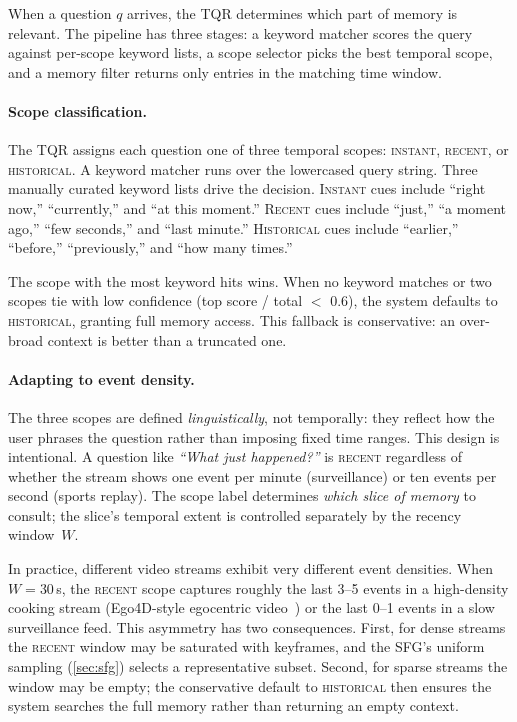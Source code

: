 When a question $q$ arrives, the TQR determines which part of memory is relevant.
The pipeline has three stages: a keyword matcher scores the query against per-scope keyword lists, a scope selector picks the best temporal scope, and a memory filter returns only entries in the matching time window.

\paragraph{Scope classification.}
The TQR assigns each question one of three temporal scopes: \textsc{instant}, \textsc{recent}, or \textsc{historical}.
A keyword matcher runs over the lowercased query string.
Three manually curated keyword lists drive the decision. \textsc{Instant} cues include ``right now,'' ``currently,'' and ``at this moment.'' \textsc{Recent} cues include ``just,'' ``a moment ago,'' ``few seconds,'' and ``last minute.'' \textsc{Historical} cues include ``earlier,'' ``before,'' ``previously,'' and ``how many times.''

The scope with the most keyword hits wins. When no keyword matches or two scopes tie with low confidence (top score / total $<$ 0.6), the system defaults to \textsc{historical}, granting full memory access. This fallback is conservative: an over-broad context is better than a truncated one.

\paragraph{Adapting to event density.}
The three scopes are defined \emph{linguistically}, not temporally: they reflect how the user phrases the question rather than imposing fixed time ranges.
This design is intentional.
A question like \emph{``What just happened?''} is \textsc{recent} regardless of whether the stream shows one event per minute (surveillance) or ten events per second (sports replay).
The scope label determines \emph{which slice of memory} to consult; the slice's temporal extent is controlled separately by the recency window~$W$.

In practice, different video streams exhibit very different event densities.
When $W = 30$\,s, the \textsc{recent} scope captures roughly the last 3--5 events in a high-density cooking stream (Ego4D-style egocentric video~\cite{grauman2022ego4d}) or the last 0--1 events in a slow surveillance feed.
This asymmetry has two consequences.
First, for dense streams the \textsc{recent} window may be saturated with keyframes, and the SFG's uniform sampling (\cref{sec:sfg}) selects a representative subset.
Second, for sparse streams the window may be empty; the conservative default to \textsc{historical} then ensures the system searches the full memory rather than returning an empty context.

